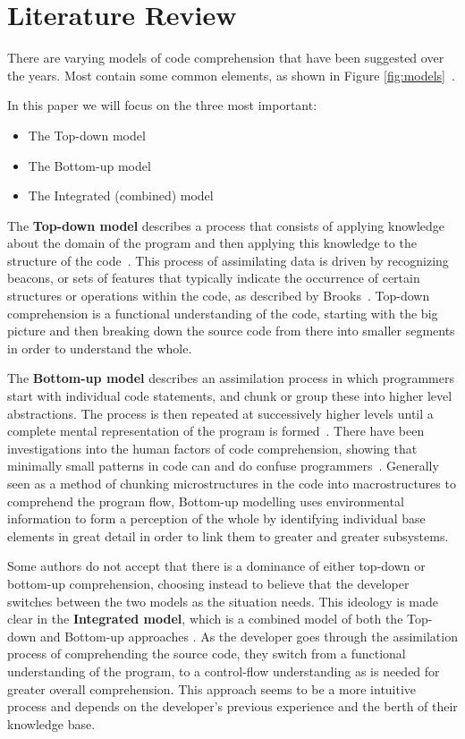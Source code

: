 \section{Literature Review}\label{sec-models}
There are varying models of code comprehension that have been
suggested over the years. Most contain some 
common elements, as shown in Figure \ref{fig:models}~\cite{noauthor_pdf_nodate}. 



In this paper we will focus on the three most important:
\begin{itemize}
    \item The Top-down model
    \item The Bottom-up model
    \item The Integrated (combined) model
\end{itemize}

The \textbf{Top-down model} describes a process that consists of applying knowledge about the domain of the
program and then applying this knowledge to the structure of the 
code~\cite{noauthor_pdf_nodate}. This
process of assimilating data is driven by recognizing beacons, or sets of features that typically
indicate the occurrence of certain structures or operations within the code, as described by Brooks~\cite{brooks_towards_1983}. 
Top-down comprehension is a functional understanding of the code, starting
with the big picture and then breaking down the source code from there into smaller segments in order
to understand the whole.

The \textbf{Bottom-up model} describes an assimilation process in 
which programmers start with individual code
statements, and chunk or group these into higher level abstractions. 
The process is then repeated at
successively higher levels until a complete mental representation of the program is formed~\cite{noauthor_pdf_nodate}. 
There have been investigations into the human factors of code
comprehension, showing that minimally small patterns in code can 
and do confuse programmers~\cite{gopstein_understanding_2017, 
gopstein_prevalence_2018}. Generally
seen as a method of chunking microstructures in the code into macrostructures to comprehend the
program flow, Bottom-up modelling uses environmental information to form a perception of the whole by
identifying individual base elements in great detail in order to link them to greater and greater
subsystems. 

Some authors do not accept that there is a dominance of either top-down or bottom-up
comprehension, choosing instead to believe that the developer switches between the two models as the
situation needs. This ideology is made clear in the 
\textbf{Integrated model}, which is a combined model of both the Top-down and Bottom-up approaches \cite{noauthor_pdf_nodate}. As the developer goes through the
assimilation process of comprehending the source code, they switch from a functional understanding of the
program, to a control-flow understanding as is needed for greater overall comprehension. This approach
seems to be a more intuitive process and depends on the developer's previous experience and the berth of
their knowledge base.

